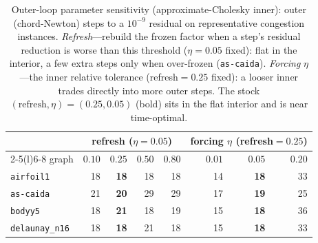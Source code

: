 \documentclass{siamart220329}
\begin{document}
\begin{table}[t]\centering\small
\caption{Outer-loop parameter sensitivity (approximate-Cholesky inner): outer (chord-Newton) steps to
a $10^{-9}$ residual on representative congestion instances. \emph{Refresh}---rebuild the frozen factor
when a step's residual reduction is worse than this threshold ($\eta{=}0.05$ fixed): flat in the
interior, a few extra steps only when over-frozen (\texttt{as-caida}). \emph{Forcing} $\eta$---the
inner relative tolerance (refresh${=}0.25$ fixed): a looser inner trades directly into more outer
steps. The stock $(\text{refresh},\eta){=}(0.25,0.05)$ (bold) sits in the flat interior and is
near time-optimal.}\label{tab:paramablation}
\begin{tabular}{lrrrr@{\qquad}rrr}
\toprule
 & \multicolumn{4}{c}{refresh ($\eta{=}0.05$)} & \multicolumn{3}{c}{forcing $\eta$ (refresh${=}0.25$)}\\
\cmidrule(lr){2-5}\cmidrule(l){6-8}
graph & $0.10$ & $\mathbf{0.25}$ & $0.50$ & $0.80$ & $0.01$ & $\mathbf{0.05}$ & $0.20$\\
\midrule
\texttt{airfoil1}      & 18 & \textbf{18} & 18 & 18 & 14 & \textbf{18} & 33\\
\texttt{as-caida}      & 21 & \textbf{20} & 29 & 29 & 17 & \textbf{19} & 25\\
\texttt{bodyy5}        & 18 & \textbf{21} & 18 & 19 & 15 & \textbf{18} & 36\\
\texttt{delaunay\_n16} & 18 & \textbf{18} & 21 & 18 & 15 & \textbf{18} & 33\\
\bottomrule
\end{tabular}
\end{table}
\end{document}
